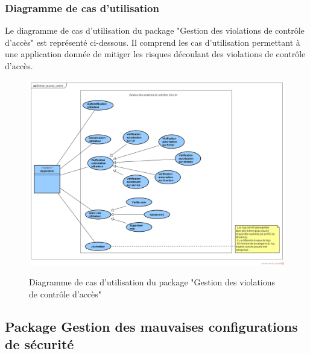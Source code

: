 \subsubsection{Diagramme de cas d'utilisation}
Le diagramme de cas d'utilisation du package "Gestion des violations de contrôle d'accès" est représenté ci-dessous. Il comprend les cas d'utilisation permettant à une application donnée de mitiger les risques découlant des violations de contrôle d'accès.\\ 
\begin{figure}[H]
	\centering
	\begin{minipage}{12cm}
		\centering
		{\includegraphics[height=0.30\textheight]{fig/Violation-controle-acces-use-case-diagram.png}}
	\end{minipage}
	\caption{Diagramme de cas d'utilisation du package "Gestion des violations de contrôle d'accès"}
	\label{fig:7.6}
\end{figure}

\subsection{Package Gestion des mauvaises configurations de sécurité}

